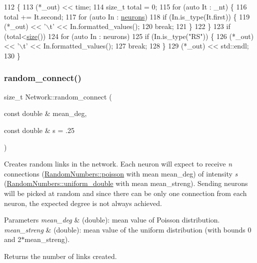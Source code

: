 \begin{DoxyCode}
112                                            \{
113     (*\_out)  << time;
114     \textcolor{keywordtype}{size\_t} total = 0;
115     \textcolor{keywordflow}{for} (\textcolor{keyword}{auto} It : \_nt) \{
116         total += It.second;
117         \textcolor{keywordflow}{for} (\textcolor{keyword}{auto} In : \hyperlink{classNetwork_a1b7832bc2c7b8855cdc3b2d6329eff9d}{neurons}) 
118             \textcolor{keywordflow}{if} (In.is\_type(It.first)) \{
119                 (*\_out) << \textcolor{charliteral}{'\(\backslash\)t'} << In.formatted\_values();
120                 \textcolor{keywordflow}{break};
121             \}
122     \}
123     \textcolor{keywordflow}{if} (total<\hyperlink{classNetwork_a41c54d12d861883170b5c5abca3a7bc8}{size}())
124         \textcolor{keywordflow}{for} (\textcolor{keyword}{auto} In : neurons) 
125             \textcolor{keywordflow}{if} (In.is\_type(\textcolor{stringliteral}{"RS"})) \{
126                 (*\_out) << \textcolor{charliteral}{'\(\backslash\)t'} << In.formatted\_values();
127                 \textcolor{keywordflow}{break};
128             \}
129     (*\_out) << std::endl;
130 \}
\end{DoxyCode}
\mbox{\label{classNetwork_a681d8f731ce258376a20f9bf062b943b}} 
\subsubsection{\texorpdfstring{random\+\_\+connect()}{random\_connect()}}
{\footnotesize\ttfamily size\+\_\+t Network\+::random\+\_\+connect (\begin{DoxyParamCaption}\item[{const double \&}]{mean\+\_\+deg,  }\item[{const double \&}]{s = {\ttfamily .25} }\end{DoxyParamCaption})}

Creates random links in the network. Each neuron will expect to receive {\itshape n} connections (\hyperlink{classRandomNumbers_a1195251686ad00cd782c9a91a44d983b}{Random\+Numbers\+::poisson} with mean {\ttfamily mean\+\_\+deg}) of intensity {\itshape s} (\hyperlink{classRandomNumbers_ae226c129494f9055ac37ed1af943d010}{Random\+Numbers\+::uniform\+\_\+double} with mean {\ttfamily mean\+\_\+streng}). Sending neurons will be picked at random and since there can be only one connection from each neuron, the expected degree is not always achieved. 
\begin{DoxyParams}{Parameters}
{\em mean\+\_\+deg} & (double)\+: mean value of Poisson distribution. \\
\hline
{\em mean\+\_\+streng} & (double)\+: mean value of the uniform distribution (with bounds 0 and 2$\ast$mean\+\_\+streng). \\
\hline
\end{DoxyParams}
\begin{DoxyReturn}{Returns}
the number of links created. 
\end{DoxyReturn}

